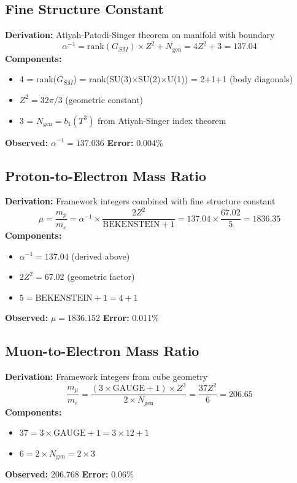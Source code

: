 \documentclass[12pt,a4paper]{article}
\newcommand{\Tthree}{T^3}
\newcommand{\Zsq}{Z^2}
\newcommand{\GAUGE}{\text{GAUGE}}
\newcommand{\BEKENSTEIN}{\text{BEKENSTEIN}}
\newcommand{\Ngen}{N_{\text{gen}}}
\begin{document}
\subsection{Fine Structure Constant}

\begin{derivedbox}
\textbf{Derivation:} Atiyah-Patodi-Singer theorem on manifold with boundary
\begin{equation}
\alpha^{-1} = \text{rank}(G_{SM}) \times \Zsq + \Ngen = 4\Zsq + 3 = 137.04
\end{equation}
\textbf{Components:}
\begin{itemize}
    \item 4 = rank($G_{SM}$) = rank(SU(3)$\times$SU(2)$\times$U(1)) = 2+1+1 (body diagonals)
    \item $\Zsq = 32\pi/3$ (geometric constant)
    \item 3 = $\Ngen = b_1(\Tthree)$ from Atiyah-Singer index theorem
\end{itemize}
\textbf{Observed:} $\alpha^{-1} = 137.036$ \quad \textbf{Error:} 0.004\%
\end{derivedbox}

\subsection{Proton-to-Electron Mass Ratio}

\begin{derivedbox}
\textbf{Derivation:} Framework integers combined with fine structure constant
\begin{equation}
\mu = \frac{m_p}{m_e} = \alpha^{-1} \times \frac{2\Zsq}{\BEKENSTEIN+1} = 137.04 \times \frac{67.02}{5} = 1836.35
\end{equation}
\textbf{Components:}
\begin{itemize}
    \item $\alpha^{-1} = 137.04$ (derived above)
    \item $2\Zsq = 67.02$ (geometric factor)
    \item $5 = \BEKENSTEIN + 1 = 4 + 1$
\end{itemize}
\textbf{Observed:} $\mu = 1836.152$ \quad \textbf{Error:} 0.011\%
\end{derivedbox}

\subsection{Muon-to-Electron Mass Ratio}

\begin{derivedbox}
\textbf{Derivation:} Framework integers from cube geometry
\begin{equation}
\frac{m_\mu}{m_e} = \frac{(3 \times \GAUGE + 1) \times \Zsq}{2 \times \Ngen} = \frac{37 \Zsq}{6} = 206.65
\end{equation}
\textbf{Components:}
\begin{itemize}
    \item $37 = 3 \times \GAUGE + 1 = 3 \times 12 + 1$
    \item $6 = 2 \times \Ngen = 2 \times 3$
\end{itemize}
\textbf{Observed:} 206.768 \quad \textbf{Error:} 0.06\%
\end{derivedbox}
\end{document}
